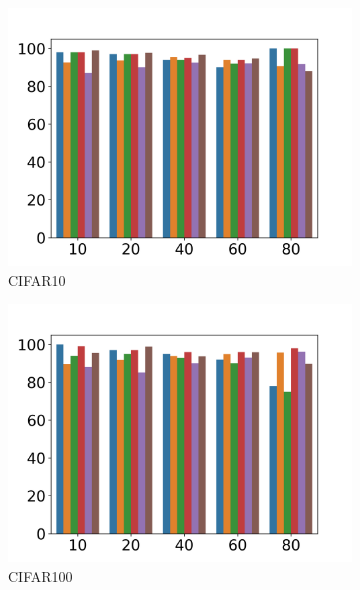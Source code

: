 \documentclass{article}
\begin{document}
\begin{figure}[h]
        \begin{subfigure}[b]{0.22\textwidth}
        \includegraphics[width=\textwidth]{figs/c10rbar.png}
        \vspace{-.5cm}
        \caption{ CIFAR10}
    \end{subfigure}
    \begin{subfigure}[b]{0.22\textwidth}
        \includegraphics[width=\textwidth]{figs/c100rbar.png}
        \vspace{-.5cm}
        \caption{CIFAR100}
    \end{subfigure}
    \begin{subfigure}[b]{0.22\textwidth}

\end{subfigure}
\end{figure}
\end{document}
